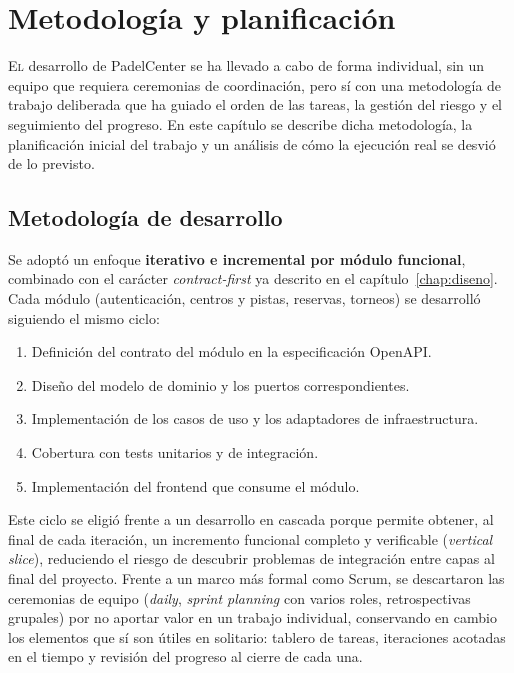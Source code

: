 \chapter{Metodología y planificación}
\label{chap:metodologia}

\lettrine{E}{l} desarrollo de PadelCenter se ha llevado a cabo de forma individual,
sin un equipo que requiera ceremonias de coordinación, pero sí con una metodología
de trabajo deliberada que ha guiado el orden de las tareas, la gestión del riesgo
y el seguimiento del progreso. En este capítulo se describe dicha metodología, la
planificación inicial del trabajo y un análisis de cómo la ejecución real se
desvió de lo previsto.

\section{Metodología de desarrollo}
\label{sec:metodologia_desarrollo}

Se adoptó un enfoque \textbf{iterativo e incremental por módulo funcional},
combinado con el carácter \textit{contract-first} ya descrito en el
capítulo~\ref{chap:diseno}. Cada módulo (autenticación, centros y pistas,
reservas, torneos) se desarrolló siguiendo el mismo ciclo:

\begin{enumerate}
  \item Definición del contrato del módulo en la especificación OpenAPI.
  \item Diseño del modelo de dominio y los puertos correspondientes.
  \item Implementación de los casos de uso y los adaptadores de infraestructura.
  \item Cobertura con tests unitarios y de integración.
  \item Implementación del frontend que consume el módulo.
\end{enumerate}

Este ciclo se eligió frente a un desarrollo en cascada porque permite obtener,
al final de cada iteración, un incremento funcional completo y verificable
(\textit{vertical slice}), reduciendo el riesgo de descubrir problemas de
integración entre capas al final del proyecto. Frente a un marco más formal
como Scrum, se descartaron las ceremonias de equipo (\textit{daily},
\textit{sprint planning} con varios roles, retrospectivas grupales) por no
aportar valor en un trabajo individual, conservando en cambio los elementos que
sí son útiles en solitario: tablero de tareas, iteraciones acotadas en el tiempo
y revisión del progreso al cierre de cada una.

